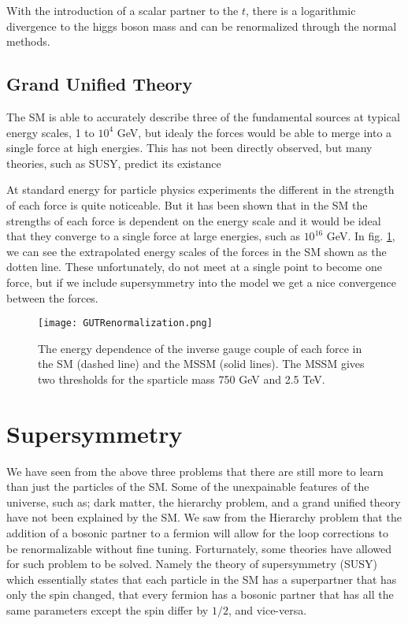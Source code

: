 With the introduction of a scalar partner to the $t$, there is a logarithmic divergence to the higgs boson mass and can be renormalized through the normal methods.

\subsection{Grand Unified Theory}

The SM is able to accurately describe three of the fundamental sources at typical energy scales, 1 to $10^{4}$ GeV, but idealy the forces would be able to merge into a single force at high energies. This has not been directly observed, but many theories, such as SUSY, predict its existance %

At standard energy for particle physics experiments the different in the strength of each force is quite noticeable. But it has been shown that in the SM the strengths of each force is dependent on the energy scale and it would be ideal that they converge to a single force at large energies, such as $10^16$ GeV. In fig. \ref{GUT}, we can see the extrapolated energy scales of the forces in the SM shown as the dotten line. These unfortunately, do not meet at a single point to become one force, but if we include supersymmetry into the model we get a nice convergence between the forces.

\begin{figure}
 	\centering
	\texttt{[image: GUTRenormalization.png]}
 	\caption{The energy dependence of the inverse gauge couple of each force in the SM (dashed line) and the MSSM (solid lines). The MSSM gives two thresholds for the sparticle mass 750 GeV and 2.5 TeV.}
 	\label{GUT} 
\end{figure}

\section{Supersymmetry}

We have seen from the above three problems that there are still more to learn than just the particles of the SM. Some of the unexpainable features of the universe, such as; dark matter, the hierarchy problem, and a grand unified theory have not been explained by the SM. We saw from the Hierarchy problem that the addition of a bosonic partner to a fermion will allow for the loop corrections to be renormalizable without fine tuning. Forturnately, some theories have allowed for such problem to be solved. Namely the theory of supersymmetry (SUSY) which essentially states that each particle in the SM has a superpartner that has only the spin changed, that every fermion has a bosonic partner that has all the same parameters except the spin differ by $1/2$, and vice-versa.

